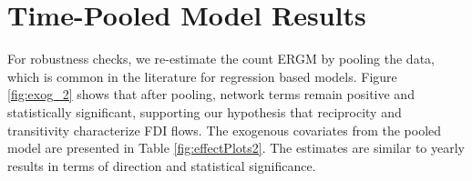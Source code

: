 \documentclass[reqno,onecolumn,letterpaper,12pt]{article}
\begin{document}
\begin{table}[!htbp]
\end{table}



\clearpage

\section{Time-Pooled Model Results}\label{pooledresults}
For robustness checks, we re-estimate the count ERGM by pooling the data, which is common in the literature for regression based models. Figure \ref{fig:exog_2} shows that after pooling, network terms remain positive and statistically significant, supporting our hypothesis that reciprocity and transitivity characterize FDI flows. The exogenous covariates from the pooled model are presented in Table \ref{fig:effectPlots2}. The estimates are similar to yearly results in terms of direction and statistical significance. %
\end{document}
